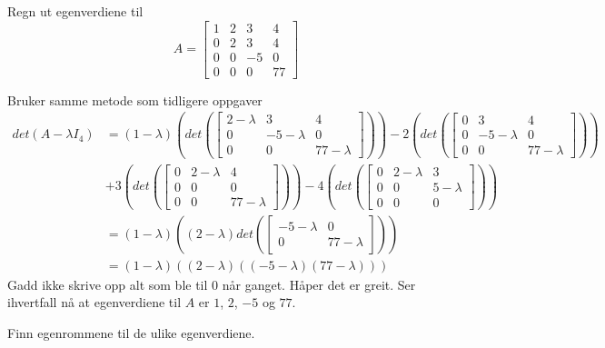 \documentclass[11pt, a4paper, norsk]{NTNUoving}
\begin{document}
    \begin{oppgave}
        \begin{punkt}
          Regn ut egenverdiene til $$A = \begin{bmatrix}
              1 & 2 & 3 & 4 \\
              0 & 2 & 3 & 4 \\
              0 & 0 & -5 & 0 \\
              0 & 0 & 0 & 77
          \end{bmatrix}$$ 

          Bruker samme metode som tidligere oppgaver
          \begin{align*}
              det(A - \lambda I_{4}) &= (1-\lambda)\left(det\left(\begin{bmatrix}
                  2-\lambda & 3 & 4 \\
                  0 & -5-\lambda & 0 \\
                  0 & 0 & 77-\lambda
              \end{bmatrix}\right)\right) - 2\left(det\left(\begin{bmatrix}
                  0 & 3 & 4 \\
                  0 & -5-\lambda & 0 \\
                  0 & 0 & 77-\lambda
              \end{bmatrix}\right)\right) 
              \\
                                     &+3\left(det\left(\begin{bmatrix}
                  0 & 2-\lambda & 4 \\
                  0 & 0 & 0 \\
                  0 & 0 & 77-\lambda
              \end{bmatrix}\right)\right) - 4\left(det\left(\begin{bmatrix}
                  0 & 2-\lambda & 3 \\
                  0 & 0 & 5-\lambda \\
                  0 & 0 & 0
              \end{bmatrix}\right)\right)
              \\
                                     &= (1-\lambda)\left((2-\lambda)det\left(\begin{bmatrix}
                                                 -5-\lambda & 0 \\
                                                 0 & 77-\lambda
                                     \end{bmatrix}\right)\right)
                                     \\
                                     &= (1-\lambda)((2-\lambda)((-5-\lambda)(77-\lambda)))
          \end{align*}
          Gadd ikke skrive opp alt som ble til $0$ når ganget. Håper det er greit. Ser ihvertfall nå at egenverdiene til $A$ er $1$, $2$, $-5$ og $77$. 
        \end{punkt}
        \begin{punkt}
            Finn egenrommene til de ulike egenverdiene.


\end{punkt}
\end{oppgave}
\end{document}
